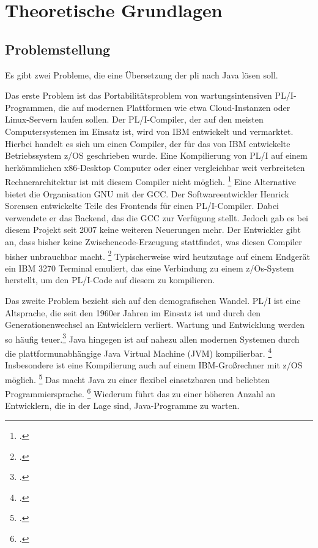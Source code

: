 



\pagebreak
\section{Theoretische Grundlagen}
\subsection{Problemstellung}
	
Es gibt zwei Probleme, die eine Übersetzung der \ac{pli} nach Java lösen soll. 

Das erste Problem ist das Portabilitätsproblem von wartungsintensiven PL/I-Programmen, die auf modernen Plattformen wie etwa Cloud-Instanzen oder Linux-Servern laufen sollen. Der PL/I-Compiler, der auf den meisten Computersystemen im Einsatz ist, wird von IBM entwickelt und vermarktet. Hierbei handelt es sich um einen Compiler, der für das von IBM entwickelte Betriebssystem z/OS geschrieben wurde. Eine Kompilierung von PL/I auf einem herkömmlichen x86-Desktop Computer oder einer vergleichbar weit verbreiteten Rechnerarchitektur ist mit diesem Compiler nicht möglich. \footcite[Vgl. ][]{plicomp} Eine Alternative bietet die Organisation GNU mit der \ac{GCC}. Der Softwareentwickler Henrick Sorensen entwickelte Teile des Frontends für einen PL/I-Compiler. Dabei verwendete er das Backend, das die \ac{GCC} zur Verfügung stellt. Jedoch gab es bei diesem Projekt seit 2007 keine weiteren Neuerungen mehr. Der Entwickler gibt an, dass bisher keine Zwischencode-Erzeugung stattfindet, was diesen Compiler bisher unbrauchbar macht. \footcite[Vgl. ][]{pligcc} 
Typischerweise wird heutzutage auf einem Endgerät ein IBM 3270 Terminal emuliert, das eine Verbindung zu einem z/Os-System herstellt, um den PL/I-Code auf diesem zu kompilieren.

Das zweite Problem bezieht sich auf den demografischen Wandel. PL/I ist eine Altsprache, die seit den 1960er Jahren im Einsatz ist und durch den Generationenwechsel an Entwicklern verliert. Wartung und Entwicklung werden so häufig teuer.\footcite[Vgl. ][S. 227ff.]{histopli} Java hingegen ist auf nahezu allen modernen Systemen durch die plattformunabhängige Java Virtual Machine (JVM) kompilierbar. \footcite[Vgl. ][]{jvm} Insbesondere ist eine Kompilierung auch auf einem IBM-Großrechner mit z/OS möglich. \footcite[Vgl. ][]{zos} Das macht Java zu einer flexibel einsetzbaren und beliebten Programmiersprache. \footcite[Vgl. ][]{tiobe} Wiederum führt das zu einer höheren Anzahl an Entwicklern, die in der Lage sind, Java-Programme zu warten.


